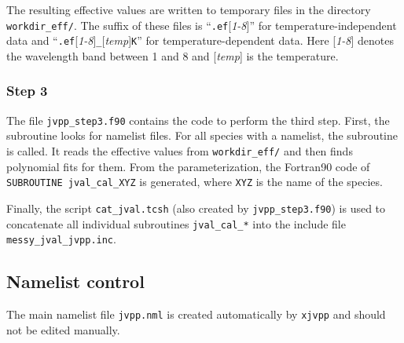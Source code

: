 \documentclass[a4paper,twoside]{article}
\begin{document}
The resulting effective values are written to temporary files in the
directory \verb|workdir_eff/|. The suffix of these files is
``\verb|.ef|[{\em 1-8}\/]'' for temperature-independent data and
``\verb|.ef|[{\em 1-8}\/]\verb|_|[{\em temp}\/]\verb|K|'' for
temperature-dependent data. Here [{\em 1-8}\/] denotes the wavelength
band between 1 and 8 and [{\em temp}\/] is the temperature.

\subsubsection{Step 3}

The file \verb|jvpp_step3.f90| contains the code to perform the third
step. First, the subroutine  looks for namelist
files. For all species with a namelist, the subroutine
 is called. It reads the effective values from
\verb|workdir_eff/| and then finds polynomial fits for them. From the
parameterization, the Fortran90 code of \verb|SUBROUTINE jval_cal_XYZ|
is generated, where \verb|XYZ| is the name of the species.

Finally, the script \verb|cat_jval.tcsh| (also created by
\verb|jvpp_step3.f90|) is used to concatenate all individual subroutines
\verb|jval_cal_*| into the include file \verb|messy_jval_jvpp.inc|.

\subsection{Namelist control}
\label{sec:nml}

The main namelist file \verb|jvpp.nml| is created automatically by
\verb|xjvpp| and should not be edited manually.
\end{document}
